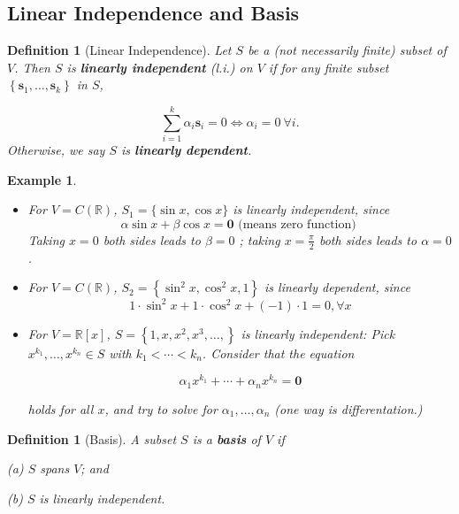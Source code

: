 \documentclass[11pt]{article}
\newtheorem{definition}[theorem]{Definition}
\newtheorem{example}[theorem]{Example}
\begin{document}
\subsection{Linear Independence and Basis}

\begin{definition}[Linear Independence] Let \(S\) be a (not necessarily finite) subset of \(V\). Then \(S\) is {\bf linearly independent} (l.i.) on \(V\) if for any finite subset \(\left\{  {{\mathbf{s}}_1,\ldots ,{\mathbf{s}}_{k}}\right\}\) in \(S\),

\[
\mathop{\sum }\limits_{{i = 1}}^{k}\alpha_{i}{\mathbf{s}}_{i} = 0 \Leftrightarrow  \alpha_{i} = 0\ \forall i.
\]
Otherwise, we say $S$ is {\bf linearly dependent}.
\end{definition}

\begin{example}
\begin{itemize}
\item For \(V = C\left( \mathbb{R}\right)\), \({S}_1 = \{ \sin x,\cos x\}\) is linearly independent, since
\[
\alpha \sin x + \beta \cos x = \mathbf{0}\text{ (means zero function) }
\]
Taking \(x = 0\) both sides leads to \(\beta  = 0\) ; taking \(x = \frac{\pi }2\) both sides leads to \(\alpha  = 0\).

\item For \(V = C\left( \mathbb{R}\right)\), \({S}_2 = \left\{  {{\sin }^2x,{\cos }^2x,1}\right\}\) is linearly dependent, since
\[
1 \cdot  {\sin }^2x + 1 \cdot  {\cos }^2x + \left( {-1}\right)  \cdot  1 = 0,\forall x
\]

\item For \(V = \mathbb{R}\left\lbrack  x\right\rbrack\), \(S = \left\{  {1,x,{x}^2,{x}^{3},\ldots ,}\right\}\) is linearly independent: Pick \({x}^{{k}_1},\ldots ,{x}^{{k}_n} \in  S\) with \({k}_1 < \cdots  < {k}_n\). Consider that the equation

\[
\alpha_1{x}^{{k}_1} + \cdots  + \alpha_n{x}^{{k}_n} = \mathbf{0}
\]

holds for all \(x\), and try to solve for \(\alpha_1,\ldots ,\alpha_n\) (one way is differentation.)
\end{itemize}
\end{example}


\begin{definition}[Basis] A subset \(S\) is a {\bf basis} of \(V\) if

(a) \(S\) spans \(V\); and

(b) \(S\) is linearly independent.
\end{definition}
\end{document}
